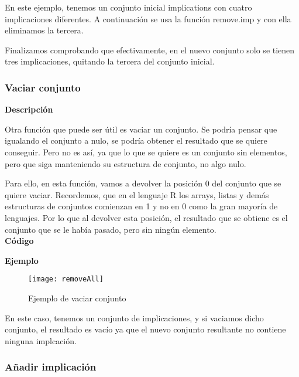     En este ejemplo, tenemos un conjunto inicial implications con cuatro implicaciones diferentes. A continuaci\'on se usa la 
    funci\'on remove.imp y con ella eliminamos la tercera.

    Finalizamos comprobando que efectivamente, en el nuevo conjunto solo se tienen tres implicaciones, quitando la tercera del conjunto 
    inicial.



\subsubsection{Vaciar conjunto}

    \textbf{Descripci\'on}

    Otra funci\'on que puede ser \'util es vaciar un conjunto. Se podr\'ia pensar que igualando el conjunto a nulo, 
    se podr\'ia obtener el resultado que se quiere conseguir. Pero no es as\'i, ya que lo que se quiere es un conjunto sin 
    elementos, pero que siga manteniendo su estructura de conjunto, no algo nulo. 
    
    Para ello, en esta funci\'on, vamos a devolver la posici\'on 0 del conjunto que se quiere vaciar. Recordemos, que en el 
    lenguaje R los arrays, listas y dem\'as estructuras de conjuntos comienzan en 1 y no en 0 como la gran mayor\'ia de lenguajes.
    Por lo que al devolver esta posici\'on, el resultado que se obtiene es el conjunto que se le hab\'ia pasado, pero sin ning\'un 
    elemento.
    \\


    \textbf{C\'odigo}

    
    \bigskip

    \textbf{Ejemplo}

    \begin{figure}[H]
        \centering
        \texttt{[image: removeAll]}
        \caption{Ejemplo de vaciar conjunto}
        \label{fig:removeAll}
    \end{figure}

    En este caso, tenemos un conjunto de implicaciones, y si vaciamos dicho conjunto, el resultado es vac\'io ya que el nuevo 
    conjunto resultante no contiene ninguna implcaci\'on.



\subsubsection{A\~nadir implicaci\'on}

